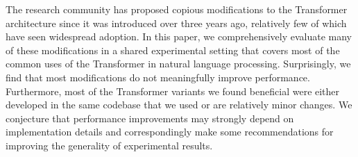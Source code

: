 The research community has proposed copious modifications to the Transformer architecture since it was introduced over three years ago, relatively few of which have seen widespread adoption. In this paper, we comprehensively evaluate many of these modifications in a shared experimental setting that covers most of the common uses of the Transformer in natural language processing. Surprisingly, we find that most modifications do not meaningfully improve performance. Furthermore, most of the Transformer variants we found beneficial were either developed in the same codebase that we used or are relatively minor changes. We conjecture that performance improvements may strongly depend on implementation details and correspondingly make some recommendations for improving the generality of experimental results.
